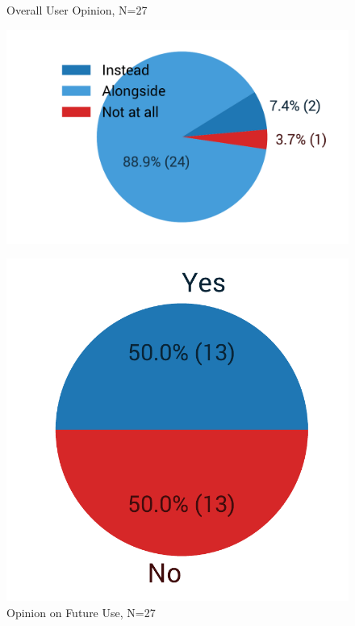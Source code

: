 \documentclass[bsc,twoside,singlespacing,parskip,logo,notimes,normalheadings]{infthesis}
\begin{document}
    \begin{figure}[!b]
      \centering
      \begin{minipage}{.48\textwidth}
        \captionsetup{width=\textwidth, justification=centering}
        \caption{Overall User Opinion, N=27}\label{fig:opinion-overall}
        \includegraphics[width=\textwidth, trim=90 0 38 0, clip]{img/alternate_use_pie.pdf}
      \end{minipage}
      \quad
      \begin{minipage}{.33\textwidth}
        \captionsetup{width=\textwidth, justification=centering}
        \caption{Opinion on Future Use, N=27}\label{fig:future-use}
        \includegraphics[width=\textwidth, trim=30 0 38 15, clip]{img/continued_use_pie.pdf}
      \end{minipage}
      \vspace{-1cm}
    \end{figure}
\end{document}
